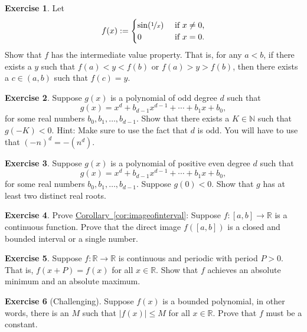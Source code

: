 \documentclass[12pt]{book}
\newcommand{\abs}[1]{\left\lvert {#1} \right\rvert}
\newcommand{\R}{{\mathbb{R}}}
\newcommand{\N}{{\mathbb{N}}}
\theoremstyle{plain}
\theoremstyle{remark}
\theoremstyle{definition}
\theoremstyle{exercise}
\newtheorem{exercise}{Exercise}[section]
\theoremstyle{example}
\newcommand{\corref}[1]{\hyperref[#1]{Corollary~\ref*{#1}}}
\begin{document}
\begin{exercise}
Let
\begin{equation*}
f(x) :=
\begin{cases}
\sin(\nicefrac{1}{x}) & \text{ if $x \not= 0$,} \\
0 & \text{ if $x=0$.}
\end{cases}
\end{equation*}
Show that $f$ has the intermediate value property.
That is, for any $a < b$, if there exists a $y$ such that $f(a) < y < f(b)$
or $f(a) > y > f(b)$, then
there exists a $c \in (a,b)$ such that $f(c) = y$.
\end{exercise}

\begin{exercise}
Suppose $g(x)$ is a polynomial of odd degree $d$ such that
\begin{equation*}
g(x) = x^d + b_{d-1} x^{d-1} + \cdots + b_1 x + b_0 ,
\end{equation*}
for some real numbers $b_{0}, b_1, \ldots, b_{d-1}$.  Show that there exists
a $K \in \N$ such that $g(-K) < 0$.  Hint: Make sure to use the fact that
$d$ is odd.  You will have to use that ${(-n)}^d = -(n^d)$.
\end{exercise}

\begin{exercise}
Suppose $g(x)$ is a polynomial of positive even degree $d$ such that
\begin{equation*}
g(x) = x^d + b_{d-1} x^{d-1} + \cdots + b_1 x + b_0 ,
\end{equation*}
for some real numbers $b_{0}, b_1, \ldots, b_{d-1}$.  Suppose 
$g(0) < 0$.  Show that $g$ has at least two distinct real roots.
\end{exercise}

\begin{exercise}
Prove \corref{cor:imageofinterval}:
Suppose $f \colon [a,b] \to \R$ is a continuous function.  Prove
that the direct image $f([a,b])$ is a closed and bounded interval or
a single number.
\end{exercise}

\begin{exercise}
Suppose $f \colon \R \to \R$ is continuous and periodic with period
$P > 0$.  That is, $f(x+P) = f(x)$ for all $x \in \R$.  Show that $f$
achieves an absolute minimum and an absolute maximum.
\end{exercise}

\begin{exercise}[Challenging]
Suppose $f(x)$ is a bounded polynomial,
in other words, there is an $M$ such that $\abs{f(x)} \leq M$
for all $x \in \R$.  Prove that $f$ must be a constant.
\end{exercise}
\end{document}

